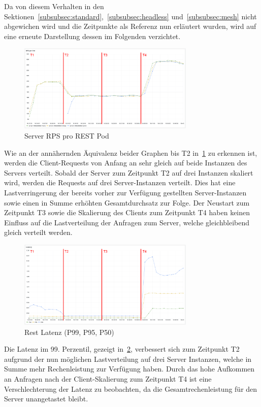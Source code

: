 Da von diesem Verhalten in den Sektionen~\ref{subsubsec:standard},~\ref{subsubsec:headless} und~\ref{subsubsec:mesh} nicht abgewichen wird und die Zeitpunkte als Referenz nun erläutert wurden, wird auf eine erneute Darstellung dessen im Folgenden verzichtet.

\begin{figure}[H]
    \centering
    \includegraphics[width=0.75\textwidth]{img/rest_rps}
    \caption{Server RPS pro REST Pod}
    \label{fig:rest_rps}
\end{figure}

Wie an der annähernden Äquivalenz beider Graphen bis T2 in~\ref{fig:rest_rps} zu erkennen ist, werden die Client-Requests von Anfang an sehr gleich auf beide Instanzen des Servers verteilt.
Sobald der Server zum Zeitpunkt T2 auf drei Instanzen skaliert wird, werden die Requests auf drei Server-Instanzen verteilt.
Dies hat eine Lastverringerung der bereits vorher zur Verfügung gestellten Server-Instanzen sowie einen in Summe erhöhten Gesamtdurchsatz zur Folge.
Der Neustart zum Zeitpunkt T3 sowie die Skalierung des Clients zum Zeitpunkt T4 haben keinen Einfluss auf die Lastverteilung der Anfragen zum Server, welche gleichbleibend gleich verteilt werden.

\begin{figure}[H]
    \centering
    \includegraphics[width=0.75\textwidth]{img/rest_latenz}
    \caption{Rest Latenz (P99, P95, P50)}
    \label{fig:rest_latenz}
\end{figure}

Die Latenz im 99. Perzentil, gezeigt in~\ref{fig:rest_latenz}, verbessert sich zum Zeitpunkt T2 aufgrund der nun möglichen Lastverteilung auf drei Server Instanzen, welche in Summe mehr Rechenleistung zur Verfügung haben.
Durch das hohe Aufkommen an Anfragen nach der Client-Skalierung zum Zeitpunkt T4 ist eine Verschlechterung der Latenz zu beobachten, da die Gesamtrechenleistung für den Server unangetastet bleibt.

